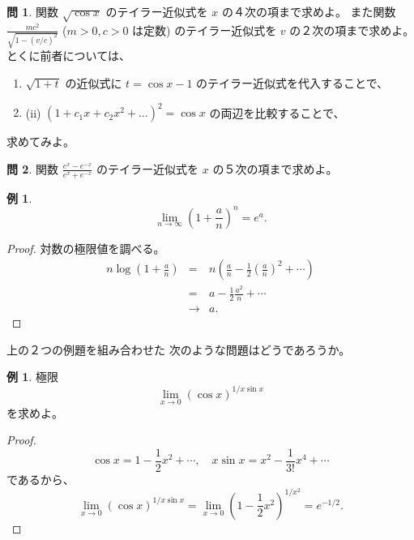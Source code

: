 \documentclass[a4paper]{jsarticle}
\theoremstyle{definition}
\newtheorem{Example}[Theorem]{例}
\newtheorem{Exercise}{問}%
\theoremstyle{remark}
\begin{document}
\begin{Exercise}
関数 $\sqrt{\cos x}$ のテイラー近似式を $x$ の４次の項まで求めよ。
また関数
$\displaystyle \frac{mc^2}{\sqrt{1-(v/c)^2}}$ 
 ($m>0, c>0$ は定数) 
のテイラー近似式を $v$ の２次の項まで求めよ。
とくに前者については、
\begin{enumerate}
\item
$\sqrt{1+t}$ の近似式に $t = \cos x -1$ のテイラー近似式を代入することで、
\item
(ii) $(1 + c_1 x + c_2 x^2 + \dots)^2 = \cos x$ の両辺を比較することで、
\end{enumerate}
求めてみよ。
\end{Exercise}

\begin{Exercise} 
関数 $\displaystyle \frac{e^x - e^{-x}}{e^x + e^{-x}}$ のテイラー近似式を $x$ の５次の項まで求めよ。
\end{Exercise}

\begin{Example}
\[
\lim_{n \to \infty} \left(1 + \frac{a}{n}\right)^n = e^a.
\]
\end{Example}

\begin{proof}
対数の極限値を調べる。
\begin{eqnarray*}
n\log\left(1 + \frac{a}{n}\right) &=& n(\frac{a}{n} -
\frac{1}{2} \left( \frac{a}{n} \right)^2 + \cdots)\\
&=& a - \frac{1}{2} \frac{a^2}{n} + \cdots\\
&\to& a.
\end{eqnarray*}
\end{proof}

上の２つの例題を組み合わせた 次のような問題はどうであろうか。

\begin{Example}
極限
\[
\lim_{x\to 0} (\cos x)^{1/x\sin x}
\]
を求めよ。
\end{Example}

\begin{proof}
\[
\cos x = 1 - \frac{1}{2} x^2 + \cdots,\quad
x\sin x = x^2 - \frac{1}{3!} x^4 + \cdots
\]
であるから、
\[
\lim_{x\to 0} (\cos x)^{1/x\sin x} =
\lim_{x\to 0} \left(1 - \frac{1}{2}x^2\right)^{1/x^2} = e^{-1/2}.
\]
\end{proof}
\end{document}
